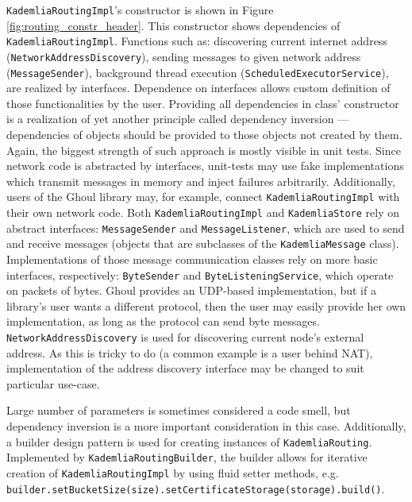 {\texttt{KademliaRoutingImpl}'s constructor} is shown in Figure
\ref{fig:routing_constr_header}.
This constructor shows dependencies of \texttt{KademliaRoutingImpl}.
Functions such as: discovering current internet address
(\texttt{NetworkAddressDiscovery}), sending messages to given network address
(\texttt{MessageSender}), background thread execution
(\texttt{ScheduledExecutorService}), are realized by interfaces.
Dependence on interfaces allows custom definition of those functionalities by
the user.
Providing all dependencies in class' constructor is a realization of yet another
principle called dependency inversion --- dependencies of objects should be
provided to those objects not created by them.
Again, the biggest strength of such approach is mostly visible in unit tests.
Since network code is abstracted by interfaces, unit-tests may use fake
implementations which transmit messages in memory and inject failures
arbitrarily.
Additionally, users of the Ghoul library may, for example, connect
\texttt{KademliaRoutingImpl} with their own network code.
Both \texttt{KademliaRoutingImpl} and \texttt{KademliaStore} rely on abstract
interfaces: \texttt{MessageSender} and \texttt{MessageListener}, which are used
to send and receive messages (objects that are subclasses of
the \texttt{KademliaMessage} class).
Implementations of those message communication classes rely on more basic
interfaces, respectively: \texttt{ByteSender} and \texttt{ByteListeningService},
which operate on packets of bytes.
Ghoul provides an UDP-based implementation, but if a library's user wants a
different protocol, then the user may easily provide her own implementation, as
long as the protocol can send byte messages.
\texttt{NetworkAddressDiscovery} is used for discovering current node's
external address.
As this is tricky to do (a common example is a user behind NAT), implementation
of the address discovery interface may be changed to suit particular use-case.

Large number of parameters is sometimes considered a code smell, but dependency
inversion is a more important consideration in this case.
Additionally, a builder design pattern is used for creating instances of
\texttt{KademliaRouting}.
Implemented by \texttt{KademliaRoutingBuilder}, the builder allows for iterative
creation of \texttt{KademliaRoutingImpl} by using fluid setter methods, e.g.
\texttt{builder.setBucketSize(size).setCertificateStorage(storage).build()}.

